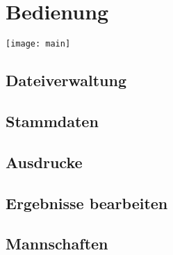 \chapter{Bedienung}

\texttt{[image: main]}

\section{Dateiverwaltung}
\label{sec:filehandling}

\section{Stammdaten}

\section{Ausdrucke}

\section{Ergebnisse bearbeiten}

\section{Mannschaften}